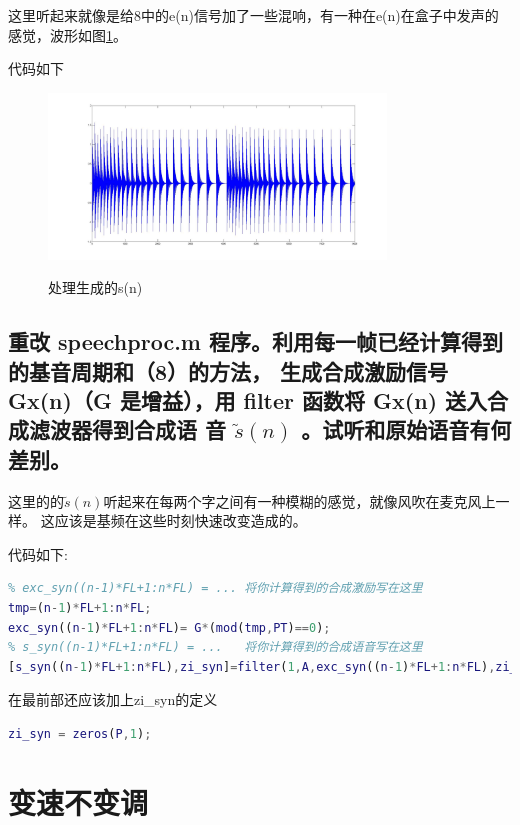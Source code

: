 \documentclass{ctexart}
\begin{document}
这里听起来就像是给8中的e(n)信号加了一些混响，有一种在e(n)在盒子中发声的感觉，波形如图\ref{9wave}。

代码如下


\begin{figure}
    \centering
    \includegraphics[width=0.8\textwidth]{9wave.jpg}\\
    \caption{处理生成的s(n)\label{9wave}}
\end{figure}

\subsection{
重改 speechproc.m 程序。利用每一帧已经计算得到的基音周期和（8）的方法，
生成合成激励信号 Gx(n)（G 是增益），用 filter 函数将 Gx(n) 送入合成滤波器得到合成语
音 $\tilde{s}(n)$ 。试听和原始语音有何差别。
}
这里的的$\tilde{s}(n)$听起来在每两个字之间有一种模糊的感觉，就像风吹在麦克风上一样。
这应该是基频在这些时刻快速改变造成的。

代码如下:
\begin{lstlisting}[language=matlab]
% (10) 在此位置写程序，生成合成激励，并用激励和filter函数产生合成语音
% exc_syn((n-1)*FL+1:n*FL) = ... 将你计算得到的合成激励写在这里
tmp=(n-1)*FL+1:n*FL;
exc_syn((n-1)*FL+1:n*FL)= G*(mod(tmp,PT)==0);
% s_syn((n-1)*FL+1:n*FL) = ...   将你计算得到的合成语音写在这里
[s_syn((n-1)*FL+1:n*FL),zi_syn]=filter(1,A,exc_syn((n-1)*FL+1:n*FL),zi_syn);
\end{lstlisting}

在最前部还应该加上zi\_syn的定义
\begin{lstlisting}[language=matlab]
zi_syn = zeros(P,1);
\end{lstlisting}

\section{变速不变调}
\setcounter{subsection}{10} 
\end{document}
